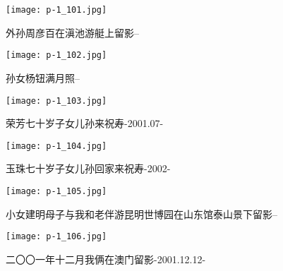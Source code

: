 \clearpage


\begin{figure}
    \begin{center}
        \texttt{[image: p-1\_101.jpg]}
        \begin{shaded}
            \caption{外孙周彦百在滇池游艇上留影--}
        \end{shaded}
    \end{center}
\end{figure}

\clearpage


\begin{figure}
    \begin{center}
        \texttt{[image: p-1\_102.jpg]}
        \begin{shaded}
            \caption{孙女杨钮满月照--}
        \end{shaded}
    \end{center}
\end{figure}

\clearpage


\begin{figure}
    \begin{center}
        \texttt{[image: p-1\_103.jpg]}
        \begin{shaded}
            \caption{荣芳七十岁子女儿孙来祝寿-2001.07-}
        \end{shaded}
    \end{center}
\end{figure}

\clearpage


\begin{figure}
    \begin{center}
        \texttt{[image: p-1\_104.jpg]}
        \begin{shaded}
            \caption{玉珠七十岁子女儿孙回家来祝寿-2002-}
        \end{shaded}
    \end{center}
\end{figure}

\clearpage


\begin{figure}
    \begin{center}
        \texttt{[image: p-1\_105.jpg]}
        \begin{shaded}
            \caption{小女建明母子与我和老伴游昆明世博园在山东馆泰山景下留影--}
        \end{shaded}
    \end{center}
\end{figure}

\clearpage


\begin{figure}
    \begin{center}
        \texttt{[image: p-1\_106.jpg]}
        \begin{shaded}
            \caption{二〇〇一年十二月我俩在澳门留影-2001.12.12-}
        \end{shaded}
    \end{center}
\end{figure}

\clearpage

